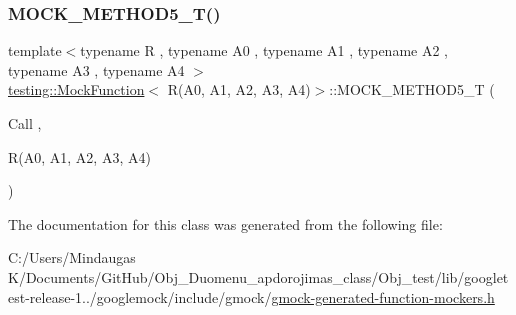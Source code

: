 \mbox{\label{classtesting_1_1_mock_function_3_01_r_07_a0_00_01_a1_00_01_a2_00_01_a3_00_01_a4_08_4_a572318905fea75f71338c120f7d1833d}} 
\subsubsection{\texorpdfstring{MOCK\_METHOD5\_T()}{MOCK\_METHOD5\_T()}}
{\footnotesize\ttfamily template$<$typename R , typename A0 , typename A1 , typename A2 , typename A3 , typename A4 $>$ \\
\mbox{\hyperlink{classtesting_1_1_mock_function}{testing\+::\+Mock\+Function}}$<$ R(A0, A1, A2, A3, A4)$>$\+::M\+O\+C\+K\+\_\+\+M\+E\+T\+H\+O\+D5\+\_\+T (\begin{DoxyParamCaption}\item[{Call}]{,  }\item[{R(A0, A1, A2, A3, A4)}]{ }\end{DoxyParamCaption})}



The documentation for this class was generated from the following file\+:\begin{DoxyCompactItemize}
\item 
C\+:/\+Users/\+Mindaugas K/\+Documents/\+Git\+Hub/\+Obj\+\_\+\+Duomenu\+\_\+apdorojimas\+\_\+class/\+Obj\+\_\+test/lib/googletest-\/release-\/1../googlemock/include/gmock/\mbox{\hyperlink{_obj__test_2lib_2googletest-release-1_88_81_2googlemock_2include_2gmock_2gmock-generated-function-mockers_8h}{gmock-\/generated-\/function-\/mockers.\+h}}\end{DoxyCompactItemize}
